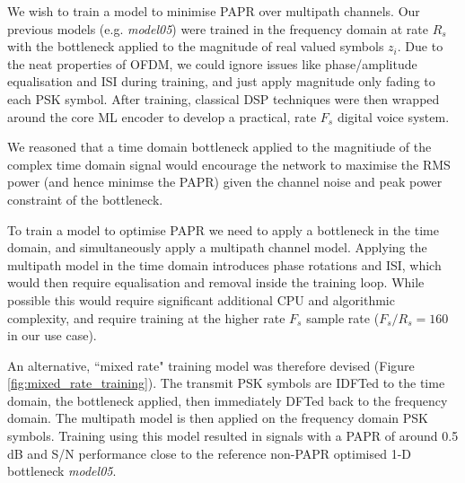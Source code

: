 \documentclass{article}
\begin{document}
We wish to train a model to minimise PAPR over multipath channels.  Our previous models (e.g. \emph{model05}) were trained in the frequency domain at rate $R_s$ with the bottleneck applied to the magnitude of real valued symbols $z_i$.  Due to the neat properties of OFDM, we could ignore issues like phase/amplitude equalisation and ISI during training, and just apply magnitude only fading to each PSK symbol.  After training, classical DSP techniques were then wrapped around the core ML encoder to develop a practical, rate $F_s$ digital voice system.

We reasoned that a time domain bottleneck applied to the magnitiude of the complex time domain signal would encourage the network to maximise the RMS power (and hence minimse the PAPR) given the channel noise and peak power constraint of the bottleneck.

To train a model to optimise PAPR we need to apply a bottleneck in the time domain, and simultaneously apply a multipath channel model.  Applying the multipath model in the time domain introduces phase rotations and ISI, which would then require equalisation and removal inside the training loop.  While possible this would require significant additional CPU and algorithmic complexity, and require training at the higher rate $F_s$ sample rate ($F_s/R_s=160$ in our use case).

An alternative, ``mixed rate" training model was therefore devised (Figure \ref{fig:mixed_rate_training}).  The transmit PSK symbols are IDFTed to the time domain, the bottleneck applied, then immediately DFTed back to the frequency domain.  The multipath model is then applied on the frequency domain PSK symbols.  Training using this model resulted in signals with a PAPR of around 0.5 dB and S/N performance close to the reference non-PAPR optimised 1-D bottleneck \emph{model05}.
\end{document}
